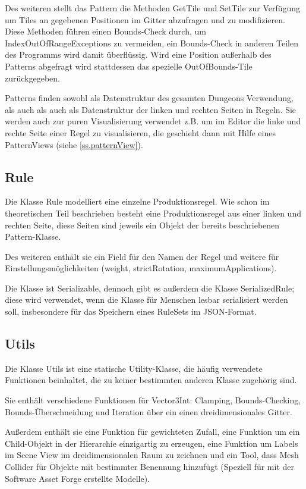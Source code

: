 Des weiteren stellt das Pattern die Methoden GetTile und SetTile zur Verfügung um Tiles an gegebenen Positionen im Gitter abzufragen und zu modifizieren. Diese Methoden führen einen Bounds-Check durch, um IndexOutOfRangeExceptions zu vermeiden, ein Bounds-Check in anderen Teilen des Programms wird damit überflüssig. Wird eine Position außerhalb des Patterns abgefragt wird stattdessen das spezielle OutOfBounds-Tile zurückgegeben.

Patterns finden sowohl als Datenstruktur des gesamten Dungeons Verwendung, als auch als auch als Datenstruktur der linken und rechten Seiten in Regeln. Sie werden auch zur puren Visualisierung verwendet z.B. um im Editor die linke und rechte Seite einer Regel zu visualisieren, die geschieht dann mit Hilfe eines PatternViews (siehe \ref{ss.patternView}).

\subsection{Rule}

Die Klasse Rule modelliert eine einzelne Produktionsregel. Wie schon im theoretischen Teil beschrieben besteht eine Produktionsregel aus einer linken und rechten Seite, diese Seiten sind jeweils ein Objekt der bereits beschriebenen Pattern-Klasse.

Des weiteren enthält sie ein Field für den Namen der Regel und weitere für Einstellungsmöglichkeiten (weight, strictRotation, maximumApplications).

Die Klasse ist Serializable, dennoch gibt es außerdem die Klasse SerializedRule; diese wird verwendet, wenn die Klasse für Menschen lesbar serialisiert werden soll, insbesondere für das Speichern eines RuleSets im JSON-Format. 

\subsection{Utils}

Die Klasse Utils ist eine statische Utility-Klasse, die häufig verwendete Funktionen beinhaltet, die zu keiner bestimmten anderen Klasse zugehörig sind.

Sie enthält verschiedene Funktionen für Vector3Int\cite[Seite: Vector3Int]{unitySciptingReference}: Clamping, Bounds-Checking, Bounds-Überschneidung und Iteration über ein einen dreidimensionales Gitter.

Außerdem enthält sie eine Funktion für gewichteten Zufall, eine Funktion um ein Child-Objekt in der Hierarchie einzigartig zu erzeugen, eine Funktion um Labels im Scene View im dreidimensionalen Raum zu zeichnen und ein Tool, dass Mesh Collider für Objekte mit bestimmter Benennung hinzufügt (Speziell für mit der Software Asset Forge erstellte Modelle).

